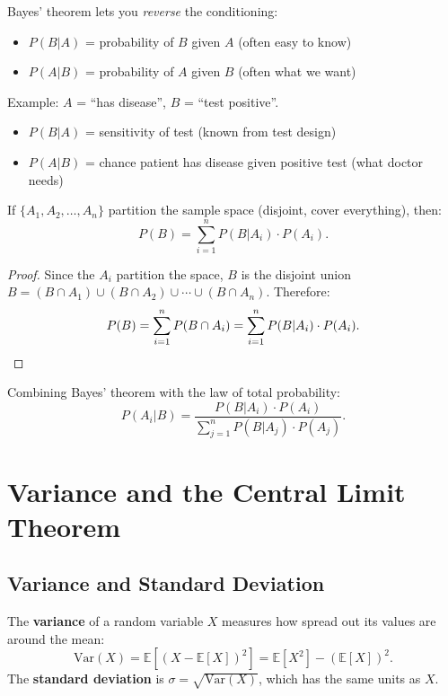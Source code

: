 \begin{remark}[Intuition]
    Bayes' theorem lets you \emph{reverse} the conditioning:
    \begin{itemize}
        \item $P(B|A)$ = probability of $B$ given $A$ (often easy to know)
        \item $P(A|B)$ = probability of $A$ given $B$ (often what we want)
    \end{itemize}
    Example: $A$ = ``has disease'', $B$ = ``test positive''.
    \begin{itemize}
        \item $P(B|A)$ = sensitivity of test (known from test design)
        \item $P(A|B)$ = chance patient has disease given positive test (what doctor needs)
    \end{itemize}
\end{remark}

\begin{proposition}
    If $\{A_1, A_2, \ldots, A_n\}$ partition the sample space (disjoint, cover everything), then:
    \[
        P(B) = \sum_{i=1}^{n} P(B|A_i) \cdot P(A_i).
    \]
\end{proposition}

\begin{proof}
    Since the $A_i$ partition the space, $B$ is the disjoint union $B = (B \cap A_1) \cup (B \cap A_2) \cup \cdots \cup (B \cap A_n)$. Therefore:
    \[
        P(B) = \sum_{i=1}^{n} P(B \cap A_i) = \sum_{i=1}^{n} P(B|A_i) \cdot P(A_i). \qedhere
    \]
\end{proof}

\begin{corollary}
    Combining Bayes' theorem with the law of total probability:
    \[
        P(A_i|B) = \frac{P(B|A_i) \cdot P(A_i)}{\sum_{j=1}^{n} P(B|A_j) \cdot P(A_j)}.
    \]
\end{corollary}

\section{Variance and the Central Limit Theorem}

\subsection{Variance and Standard Deviation}

\begin{definition}[Variance]
    The \textbf{variance} of a random variable $X$ measures how spread out its values are around the mean:
    \[
        \mathrm{Var}(X) = \mathbb{E}[(X - \mathbb{E}[X])^2] = \mathbb{E}[X^2] - (\mathbb{E}[X])^2.
    \]
    The \textbf{standard deviation} is $\sigma = \sqrt{\mathrm{Var}(X)}$, which has the same units as $X$.
\end{definition}

